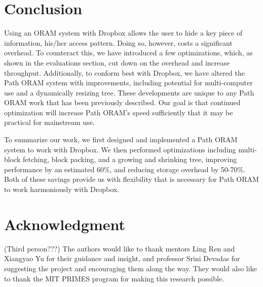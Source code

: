 \documentclass[conference]{IEEEtran}
\begin{document}



\section{Conclusion}
Using an ORAM system with Dropbox allows the user to hide a key piece of information, his/her access pattern. Doing so, however, costs a significant overhead. To counteract this, we have introduced a few optimizations, which, as shown in the evaluations section, cut down on the overhead and increase throughput. Additionally, to conform best with Dropbox, we have altered the Path ORAM system with improvements, including potential for multi-computer use and a dynamically resizing tree. These developments are unique to any Path ORAM work that has been previously described. Our goal is that continued optimization will increase Path ORAM’s speed sufficiently that it may be practical for mainstream use. 

To summarize our work, we first designed and implemented a Path ORAM system to work with Dropbox. We then performed optimizations including multi-block fetching, block packing, and a growing and shrinking tree, improving performance by an estimated 60\%, and reducing storage overhead by 50-70\%. Both of these savings provide us with flexibility that is necessary for Path ORAM to work harmoniously with Dropbox.







\section*{Acknowledgment}


(Third person???) The authors would like to thank mentors Ling Ren and Xiangyao Yu for their guidance and insight, and professor Srini Devadas for suggesting the project and encouraging them along the way. They would also like to thank the MIT PRIMES program for making this research possible.
\end{document}
